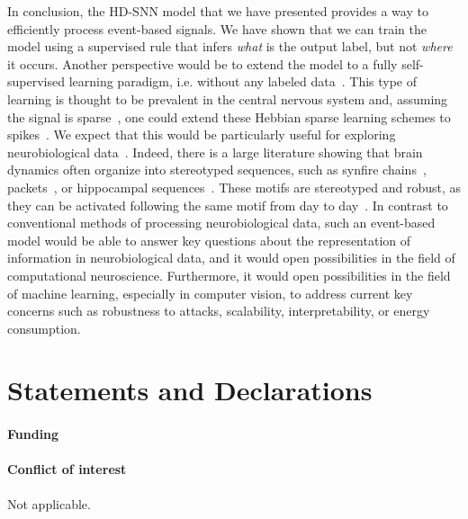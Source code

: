 \documentclass[default]{sn-jnl}%
\theoremstyle{thmstyleone}%
\theoremstyle{thmstyletwo}%
\theoremstyle{thmstylethree}%
\begin{document}
In conclusion, the HD-SNN model that we have presented provides a way to efficiently process event-based signals. We have shown that we can train the model using a supervised rule that infers \emph{what} is the output label, but not \emph{where} it occurs. Another perspective would be to extend the model to a fully self-supervised learning paradigm, i.e. without any labeled data~\citep{barlow_unsupervised_1989}. This type of learning is thought to be prevalent in the central nervous system and, assuming the signal is sparse~\citep{olshausen_emergence_1996}, one could extend these Hebbian sparse learning schemes to spikes~\citep{perrinet_emergence_2004, masquelier_competitive_2009}. We expect that this would be particularly useful for exploring neurobiological data~\citep{Perrinet23ICANN}. Indeed, there is a large literature showing that brain dynamics often organize into stereotyped sequences, such as synfire chains~\citep{ikegaya_synfire_2004}, packets~\citep{luczak_sequential_2007}, or hippocampal sequences~\citep{pastalkova_internally_2008, villette_internally_2015}. These motifs are stereotyped and robust, as they can be activated following the same motif from day to day~\citep{haimerl_internal_2019}. In contrast to conventional methods of processing neurobiological data, such an event-based model would be able to answer key questions about the representation of information in neurobiological data, and it would open possibilities in the field of computational neuroscience. Furthermore, it would open possibilities in the field of machine learning, especially in computer vision, to address current key concerns such as robustness to attacks, scalability, interpretability, or energy consumption.
%
\backmatter
%
%
\Acknowledgments
%

\section*{Statements and Declarations}

\paragraph{Funding}

\Funding %

\paragraph{Conflict of interest}
Not applicable.
\end{document}
